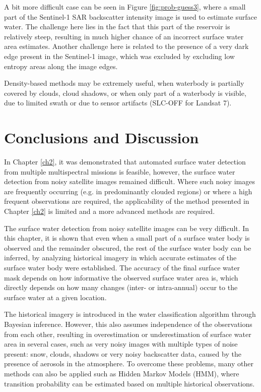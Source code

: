 A bit more difficult case can be seen in Figure \ref{fig:prob-guess3}, where a small part of the Sentinel-1 SAR backscatter intensity image is used to estimate surface water. The challenge here lies in the fact that this part of the reservoir is relatively steep, resulting in much higher chance of an incorrect surface water area estimates. Another challenge here is related to the presence of a very dark edge present in the Sentinel-1 image, which was excluded by excluding low entropy areas along the image edges. 

Density-based methods may be extremely useful, when waterbody is partially covered by clouds, cloud shadows, or when only part of a waterbody is visible, due to limited swath or due to sensor artifacts (SLC-OFF for Landsat 7). 

\section{Conclusions and Discussion}

In Chapter \ref{ch2}, it was demonstrated that automated surface water detection from multiple multispectral missions is feasible, however, the surface water detection from noisy satellite images remained difficult. Where such noisy images are frequently occurring (e.g. in predominantly clouded regions) or where a high frequent observations are required, the applicability of the method presented in Chapter \ref{ch2} is limited and a more advanced methods are required. 

The surface water detection from noisy satellite images can be very difficult. In this chapter, it is shown that even when a small part of a surface water body is observed and the remainder obscured, the rest of the surface water body can be inferred, by analyzing historical imagery in which accurate estimates of the surface water body were established. The accuracy of the final surface water mask depends on how informative the observed surface water area is, which directly depends on how many changes (inter- or intra-annual) occur to the surface water at a given location.

The historical imagery is introduced in the water classification algorithm through Bayesian inference. However, this also assumes independence of the observations from each other, resulting in overestimation or underestimation of surface water area in several cases, such as very noisy images with multiple types of noise present: snow, clouds, shadows or very noisy backscatter data, caused by the presence of aerosols in the atmosphere. To overcome these problems, many other methods can also be applied such as Hidden Markov Models (HMM), where transition probability can be estimated based on multiple historical observations.

